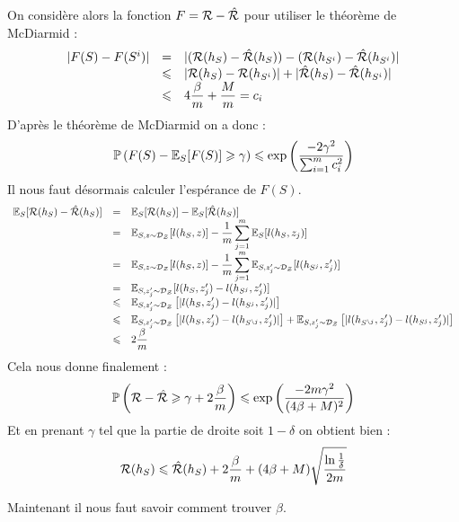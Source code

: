 On considère alors la fonction $F = \mathcal{R} - \hat{\mathcal{R}}$ pour utiliser le théorème de McDiarmid :
$$ \begin{array}{lll}
	| F(S) - F(S^i) |
	& = & | (\mathcal{R}(h_S) - \hat{\mathcal{R}}(h_S)) - (\mathcal{R}(h_{S^i}) - \hat{\mathcal{R}}(h_{S^i}) | \\
	& \leqslant & | \mathcal{R}(h_S) - \mathcal{R}(h_{S^i}) | + | \hat{\mathcal{R}}(h_S) - \hat{\mathcal{R}}(h_{S^i}) | \\
	& \leqslant & 4 \dfrac{\beta}{m} + \dfrac{M}{m} = c_i
\end{array} $$
D'après le théorème de McDiarmid on a donc :
$$ \mathbb{P} \left(F(S) - \mathbb{E}_S[F(S)] \geqslant \gamma \right) \leqslant \exp \left( \dfrac{- 2 \gamma^2}{\sum_{i = 1}^m c_i^2} \right) $$
Il nous faut désormais calculer l'espérance de $F(S)$.
$$ \begin{array}{lll}
	\E_S[\trisk(h_S) - \erisk(h_S)]
	& = & \E_S[\trisk(h_S)] - \E_S[\erisk(h_S)] \\
	& = &\displaystyle \E_{S, z \sim \dist}[l(h_S, z)] - \dfrac{1}{m} \sum_{j = 1}^m \E_S[l(h_S, z_j)] \\
	& = & \displaystyle \E_{S, z \sim \dist}[l(h_S, z)] - \dfrac{1}{m} \sum_{j = 1}^m \E_{S, z_j^\prime \sim \dist}[l(h_{S^j}, z_j^\prime)] \\
	& = & \E_{S, z_j^\prime \sim \dist}[l(h_S, z_j^\prime)-l(h_{S^j}, z_j^\prime)] \\ \vspace{1mm}
	& \leqslant & \displaystyle \E_{S, z_j^\prime \sim \dist} \left[ | l(h_S, z_j^\prime)-l(h_{S^j}, z_j^\prime) | \right] \\
	& \leqslant & \displaystyle \E_{S, z_j^\prime \sim \dist} \left[ | l(h_S, z_j^\prime)-l(h_{S^{\setminus j}}, z_j^\prime) | \right] + \E_{S, z_j^\prime \sim \dist} \left[ | l(h_{S^{\setminus j}}, z_j^\prime)-l(h_{S^j}, z_j^\prime) | \right] \\
	& \leqslant & 2 \dfrac{\beta}{m}
\end{array} $$
Cela nous donne finalement :
$$ \mathbb{P} \left( \mathcal{R} - \hat{\mathcal{R}} \geqslant \gamma + 2 \dfrac{\beta}{m} \right) \leqslant \exp \left( \dfrac{- 2 m \gamma^2}{(4 \beta + M)^2} \right) $$
Et en prenant $\gamma$ tel que la partie de droite soit $1 - \delta$ on obtient bien :
$$ \mathcal{R}(h_S) \leqslant \hat{\mathcal{R}}(h_S) + 2 \dfrac{\beta}{m} + (4 \beta + M) \sqrt{\dfrac{\ln \frac{1}{\delta}}{2m}} $$
\findem

Maintenant il nous faut savoir comment trouver $\beta$.


